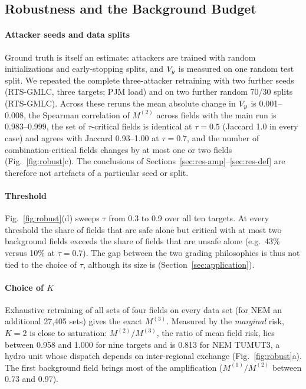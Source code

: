 \subsection{Robustness and the Background Budget}\label{sec:res-robust}

\paragraph{Attacker seeds and data splits}
Ground truth is itself an estimate: attackers are trained with random initializations and
early-stopping splits, and $V_y$ is measured on one random test split. We repeated the complete
three-attacker retraining with two further seeds (RTS-GMLC, three targets; PJM load) and on two
further random 70/30 splits (RTS-GMLC). Across these reruns the mean absolute change in $V_y$ is
0.001--0.008, the Spearman correlation of $M^{(2)}$ across fields with the main run is 0.983--0.999,
the set of $\tau$-critical fields is identical at $\tau=0.5$ (Jaccard 1.0 in every case) and agrees
with Jaccard 0.93--1.00 at $\tau=0.7$, and the number of combination-critical fields changes by at
most one or two fields (Fig.~\ref{fig:robust}c). The conclusions of
Sections~\ref{sec:res-amp}--\ref{sec:res-def} are therefore not artefacts of a particular seed or
split.

\paragraph{Threshold}
Fig.~\ref{fig:robust}(d) sweeps $\tau$ from 0.3 to 0.9 over all ten targets. At every threshold the
share of fields that are safe alone but critical with at most two background fields exceeds the share
of fields that are unsafe alone (e.g.\ 43\% versus 10\% at $\tau=0.7$). The gap between the two grading
philosophies is thus not tied to the choice of $\tau$, although its size is
(Section~\ref{sec:application}).

\paragraph{Choice of $K$}
Exhaustive retraining of all sets of four fields on every data set (for NEM an additional 27,405 sets)
gives the exact $M^{(3)}$. Measured by the \emph{marginal} risk, $K=2$ is close to saturation:
$M^{(2)}/M^{(3)}$, the ratio of mean field risk, lies between 0.958 and 1.000 for nine targets and is
0.813 for NEM TUMUT3, a hydro unit whose dispatch depends on inter-regional exchange
(Fig.~\ref{fig:robust}a). The first background field brings most of the amplification ($M^{(1)}/M^{(2)}$
between 0.73 and 0.97).

